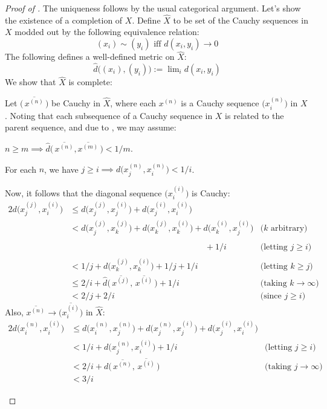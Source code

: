 	\begin{proof}[Proof of ]
		The uniqueness follows by the usual categorical argument. Let's show the existence of a completion of $X$. Define $\hat X$ to be set of the Cauchy sequences in $X$ modded out by the following equivalence relation:
		\[
		(x_i)\sim (y_i) \text{ iff } d(x_i, y_i)\to 0
		\]
		The following defines a well-defined metric on $\hat X$:
		\[
		\hat d\bigl( (x_i), (y_i) \bigr) := \lim\nolimits_i d(x_i, y_i)
		\]
		We show that $\hat X$ is complete:
		\begin{subproof}
			Let $\bigl(\,\overline{x^{(n)}}\,\bigr)$ be Cauchy in $\hat X$, where each $x^{(n)}$ is a Cauchy sequence $\bigl(x^{(n)}_i\bigr)$ in $X$. Noting that each subsequence of a Cauchy sequence in $X$ is related to the parent sequence, and due to , we may \wlogg assume:
			\begin{mylist}
				\item $n \ge m\implies \hat d\bigl(\, \overline{x^{(n)}}, \overline{x^{(m)}}\, \bigr) < 1/m$.
				
				\item For each $n$, we have $j\ge i\implies d\bigl(x^{(n)}_j, x^{(n)}_i\bigr) < 1/i$.
			\end{mylist}
			Now, it follows that the diagonal sequence $\bigl(x^{(i)}_i\bigr)$ is Cauchy:
			\begin{alignat*}{2}
				d\bigl(x^{(j)}_j, x^{(i)}_i\bigr)
				& \le d\bigl(x^{(j)}_j, x^{(i)}_j\bigr) + d\bigl(x^{(i)}_j, x^{(i)}_i\bigr)\\
				& < d\bigl(x^{(j)}_j, x^{(j)}_k\bigr) + d\bigl(x^{(j)}_k, x^{(i)}_k\bigr) + d\bigl(x^{(i)}_k, x^{(i)}_j\bigr) & \text{($k$ arbitrary)}\\
				& \phantom{{} < d\bigl(x^{(j)}_j, x^{(j)}_k\bigr) + d\bigl(x^{(j)}_k, x^{(i)}_k\bigr) abc} {}+ 1/i & \text{(letting $j\ge i$)}\\
				& < 1/j + d\bigl(x^{(j)}_k, x^{(i)}_k\bigr) + 1/j +1/i & \text{(letting $k\ge j$)}\\
				& \le 2/i + \hat d\bigl(\, \overline{x^{(j)}},\, \overline{x^{(i)}}\, \bigr) + 1/i & \text{(taking $k\to \infty$)}\\
				& < 2/j + 2/i & \text{(since $j\ge i$)}
 			\end{alignat*}
			Also, $\overline{x^{(n)}}\to \overline{\bigl(x^{(i)}_i\bigr)}$ in $\hat X$:
			\begin{alignat*}{2}
				d\bigl( x^{(n)}_i, x^{(i)}_i \bigr)
				& \le d\bigl( x^{(n)}_i, x^{(n)}_j \bigr) + d\bigl( x^{(n)}_j, x^{(i)}_j \bigr) + d\bigl( x^{(i)}_j, x^{(i)}_i \bigr)\\
				& < 1/i + d\bigl( x^{(n)}_j, x^{(i)}_i \bigr) + 1/i & \text{(letting $j\ge i$)}\\
				& < 2/i + d\bigl(\, \overline{x^{(n)}},\,\overline{x^{(i)}} \,\bigr) & \text{(taking $j\to\infty$)}\\
				& < 3/i
			\end{alignat*}
		\end{subproof}


\end{proof}
